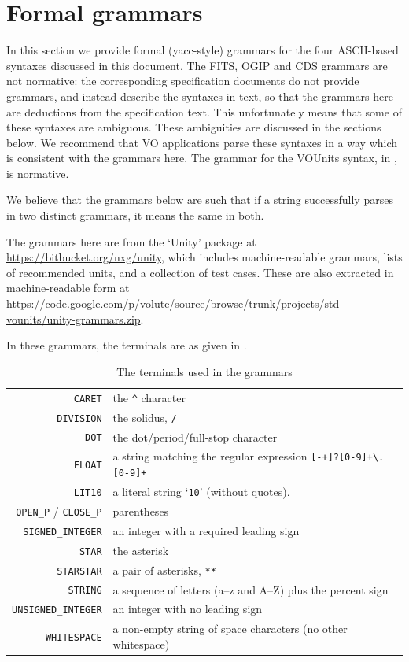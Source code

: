 \documentclass[11pt,notitlepage,onecolumn]{ivoa}
\begin{document}
\section{Formal grammars\label{appx:grammar}}

In this section we provide formal (yacc-style) grammars for the four
ASCII-based syntaxes discussed in this document.  The FITS, OGIP and
CDS grammars are not normative: the corresponding specification
documents do not provide grammars, and instead describe the syntaxes
in text, so that the grammars here are deductions from the
specification text.
This unfortunately means that some of these syntaxes are ambiguous.
These ambiguities are discussed in the sections below.  We recommend
that VO applications parse these syntaxes in a way which is consistent
with the grammars here.
%
The grammar for the VOUnits syntax, in , is normative.

We believe that the grammars below are such that if a string 
successfully parses in two distinct grammars, it means the same in
both.

The grammars here are from the `Unity' package at
\url{https://bitbucket.org/nxg/unity}, which includes machine-readable
grammars, lists of recommended units, and a collection of test cases.  These are also extracted in
machine-readable form
at \url{https://code.google.com/p/volute/source/browse/trunk/projects/std-vounits/unity-grammars.zip}.

In these grammars, the terminals are as given in
.
\begin{table}[ht]
\begin{tabular}{rp{9cm}}
\texttt{CARET}&the \texttt{\^{}} character\tabularnewline
\texttt{DIVISION}&the solidus, \texttt{/}\tabularnewline
\texttt{DOT}&the dot/period/full-stop character\tabularnewline
\texttt{FLOAT}&a string matching the regular expression
       \texttt{[-+]?[0-9]+\textbackslash.[0-9]+}\raggedright\tabularnewline
\texttt{LIT10}&a literal string `\texttt{10}' (without quotes).\tabularnewline
\texttt{OPEN\_P} / \texttt{CLOSE\_P}&parentheses\tabularnewline
\texttt{SIGNED\_INTEGER}&an integer with a required leading sign\raggedright\tabularnewline
\texttt{STAR}&the asterisk\tabularnewline
\texttt{STARSTAR}&a pair of asterisks, \texttt{**}\tabularnewline
\texttt{STRING}&a sequence of letters (a--z and A--Z) plus the percent sign\raggedright\tabularnewline
\texttt{UNSIGNED\_INTEGER}&an integer with no leading sign\raggedright\tabularnewline
\texttt{WHITESPACE}&a non-empty string of space characters (no other whitespace)\raggedright\tabularnewline
\end{tabular}
\caption{\label{tabx:terminals}The terminals used in the grammars}
\end{table}
\end{document}
